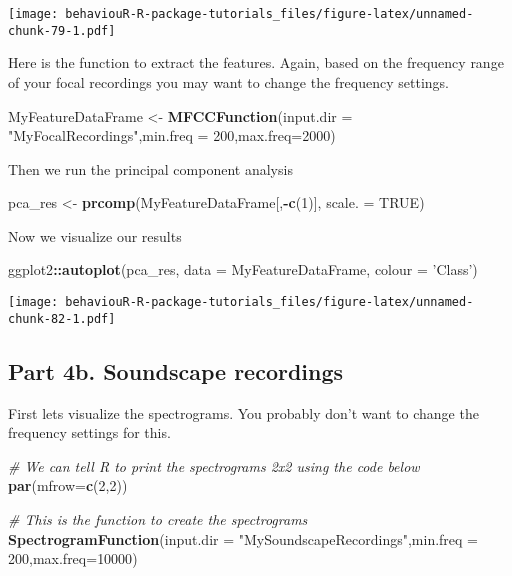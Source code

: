 \documentclass[]{book}
\newenvironment{Shaded}{\begin{snugshade}}{\end{snugshade}}
\newcommand{\CommentTok}[1]{\textcolor[rgb]{0.56,0.35,0.01}{\textit{#1}}}
\newcommand{\DataTypeTok}[1]{\textcolor[rgb]{0.13,0.29,0.53}{#1}}
\newcommand{\DecValTok}[1]{\textcolor[rgb]{0.00,0.00,0.81}{#1}}
\newcommand{\KeywordTok}[1]{\textcolor[rgb]{0.13,0.29,0.53}{\textbf{#1}}}
\newcommand{\NormalTok}[1]{#1}
\newcommand{\OperatorTok}[1]{\textcolor[rgb]{0.81,0.36,0.00}{\textbf{#1}}}
\newcommand{\OtherTok}[1]{\textcolor[rgb]{0.56,0.35,0.01}{#1}}
\newcommand{\StringTok}[1]{\textcolor[rgb]{0.31,0.60,0.02}{#1}}
\begin{document}
\texttt{[image: behaviouR-R-package-tutorials\_files/figure-latex/unnamed-chunk-79-1.pdf]}

Here is the function to extract the features. Again, based on the frequency range of your focal recordings you may want to change the frequency settings.

\begin{Shaded}
\begin{Highlighting}[]
\NormalTok{MyFeatureDataFrame <-}\StringTok{ }\KeywordTok{MFCCFunction}\NormalTok{(}\DataTypeTok{input.dir =} \StringTok{"MyFocalRecordings"}\NormalTok{,}\DataTypeTok{min.freq =} \DecValTok{200}\NormalTok{,}\DataTypeTok{max.freq=}\DecValTok{2000}\NormalTok{)}
\end{Highlighting}
\end{Shaded}

Then we run the principal component analysis

\begin{Shaded}
\begin{Highlighting}[]
\NormalTok{pca_res <-}\StringTok{ }\KeywordTok{prcomp}\NormalTok{(MyFeatureDataFrame[,}\OperatorTok{-}\KeywordTok{c}\NormalTok{(}\DecValTok{1}\NormalTok{)], }\DataTypeTok{scale. =} \OtherTok{TRUE}\NormalTok{)}
\end{Highlighting}
\end{Shaded}

Now we visualize our results

\begin{Shaded}
\begin{Highlighting}[]
\NormalTok{ggplot2}\OperatorTok{::}\KeywordTok{autoplot}\NormalTok{(pca_res, }\DataTypeTok{data =}\NormalTok{ MyFeatureDataFrame,}
         \DataTypeTok{colour =} \StringTok{'Class'}\NormalTok{)}
\end{Highlighting}
\end{Shaded}

\texttt{[image: behaviouR-R-package-tutorials\_files/figure-latex/unnamed-chunk-82-1.pdf]}

\hypertarget{part-4b.-soundscape-recordings}{%
\subsection{Part 4b. Soundscape recordings}\label{part-4b.-soundscape-recordings}}

First lets visualize the spectrograms. You probably don't want to change the frequency settings for this.

\begin{Shaded}
\begin{Highlighting}[]
\CommentTok{# We can tell R to print the spectrograms 2x2 using the code below}
\KeywordTok{par}\NormalTok{(}\DataTypeTok{mfrow=}\KeywordTok{c}\NormalTok{(}\DecValTok{2}\NormalTok{,}\DecValTok{2}\NormalTok{))}

\CommentTok{# This is the function to create the spectrograms}
\KeywordTok{SpectrogramFunction}\NormalTok{(}\DataTypeTok{input.dir =} \StringTok{"MySoundscapeRecordings"}\NormalTok{,}\DataTypeTok{min.freq =} \DecValTok{200}\NormalTok{,}\DataTypeTok{max.freq=}\DecValTok{10000}\NormalTok{)}
\end{Highlighting}
\end{Shaded}
\end{document}
